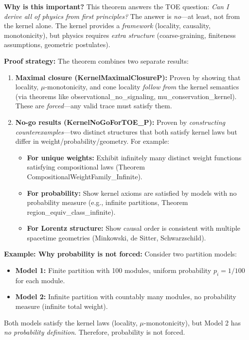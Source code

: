 \textbf{Why is this important?} This theorem answers the TOE question: \textit{Can I derive all of physics from first principles?} The answer is \textit{no}---at least, not from the kernel alone. The kernel provides a \textit{framework} (locality, causality, monotonicity), but physics requires \textit{extra structure} (coarse-graining, finiteness assumptions, geometric postulates).

\textbf{Proof strategy:} The theorem combines two separate results:
\begin{enumerate}
    \item \textbf{Maximal closure (KernelMaximalClosureP):} Proven by showing that locality, $\mu$-monotonicity, and cone locality \textit{follow from} the kernel semantics (via theorems like observational\_no\_signaling, mu\_conservation\_kernel). These are \textit{forced}---any valid trace must satisfy them.
    
    \item \textbf{No-go results (KernelNoGoForTOE\_P):} Proven by \textit{constructing counterexamples}---two distinct structures that both satisfy kernel laws but differ in weight/probability/geometry. For example:
    \begin{itemize}
        \item \textbf{For unique weights:} Exhibit infinitely many distinct weight functions satisfying compositional laws (Theorem CompositionalWeightFamily\_Infinite).
        \item \textbf{For probability:} Show kernel axioms are satisfied by models with no probability measure (e.g., infinite partitions, Theorem region\_equiv\_class\_infinite).
        \item \textbf{For Lorentz structure:} Show causal order is consistent with multiple spacetime geometries (Minkowski, de Sitter, Schwarzschild).
    \end{itemize}
\end{enumerate}

\textbf{Example: Why probability is not forced:}
Consider two partition models:
\begin{itemize}
    \item \textbf{Model 1:} Finite partition with 100 modules, uniform probability $p_i = 1/100$ for each module.
    \item \textbf{Model 2:} Infinite partition with countably many modules, no probability measure (infinite total weight).
\end{itemize}
Both models satisfy the kernel laws (locality, $\mu$-monotonicity), but Model 2 has \textit{no probability definition}. Therefore, probability is not forced.

